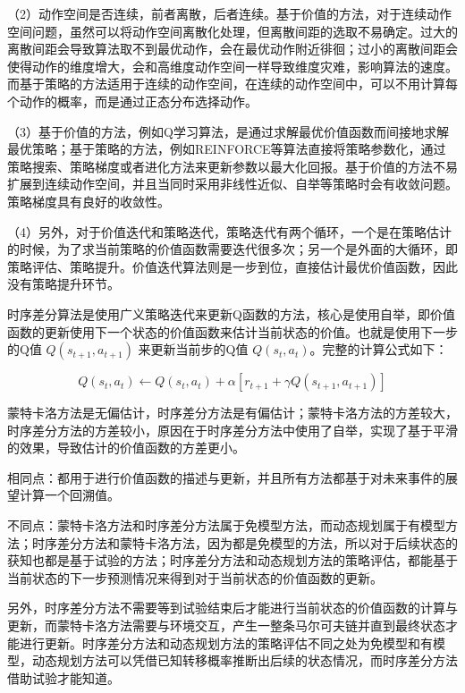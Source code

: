 （2）动作空间是否连续，前者离散，后者连续。基于价值的方法，对于连续动作空间问题，虽然可以将动作空间离散化处理，但离散间距的选取不易确定。过大的离散间距会导致算法取不到最优动作，会在最优动作附近徘徊；过小的离散间距会使得动作的维度增大，会和高维度动作空间一样导致维度灾难，影响算法的速度。而基于策略的方法适用于连续的动作空间，在连续的动作空间中，可以不用计算每个动作的概率，而是通过正态分布选择动作。

（3）基于价值的方法，例如Q学习算法，是通过求解最优价值函数而间接地求解最优策略；基于策略的方法，例如REINFORCE等算法直接将策略参数化，通过策略搜索、策略梯度或者进化方法来更新参数以最大化回报。基于价值的方法不易扩展到连续动作空间，并且当同时采用非线性近似、自举等策略时会有收敛问题。策略梯度具有良好的收敛性。

（4）另外，对于价值迭代和策略迭代，策略迭代有两个循环，一个是在策略估计的时候，为了求当前策略的价值函数需要迭代很多次；另一个是外面的大循环，即策略评估、策略提升。价值迭代算法则是一步到位，直接估计最优价值函数，因此没有策略提升环节。


时序差分算法是使用广义策略迭代来更新Q函数的方法，核心是使用自举，即价值函数的更新使用下一个状态的价值函数来估计当前状态的价值。也就是使用下一步的Q值 $Q(s_{t+1},a_{t+1})$ 来更新当前步的Q值 $Q(s_t,a_t) $。完整的计算公式如下：

$$
Q(s_t,a_t) \leftarrow	 Q(s_t,a_t) + \alpha [r_{t+1}+\gamma Q(s_{t+1},a_{t+1})]
$$


蒙特卡洛方法是无偏估计，时序差分方法是有偏估计；蒙特卡洛方法的方差较大，时序差分方法的方差较小，原因在于时序差分方法中使用了自举，实现了基于平滑的效果，导致估计的价值函数的方差更小。


相同点：都用于进行价值函数的描述与更新，并且所有方法都基于对未来事件的展望计算一个回溯值。

不同点：蒙特卡洛方法和时序差分方法属于免模型方法，而动态规划属于有模型方法；时序差分方法和蒙特卡洛方法，因为都是免模型的方法，所以对于后续状态的获知也都是基于试验的方法；时序差分方法和动态规划方法的策略评估，都能基于当前状态的下一步预测情况来得到对于当前状态的价值函数的更新。

另外，时序差分方法不需要等到试验结束后才能进行当前状态的价值函数的计算与更新，而蒙特卡洛方法需要与环境交互，产生一整条马尔可夫链并直到最终状态才能进行更新。时序差分方法和动态规划方法的策略评估不同之处为免模型和有模型，动态规划方法可以凭借已知转移概率推断出后续的状态情况，而时序差分方法借助试验才能知道。
  
